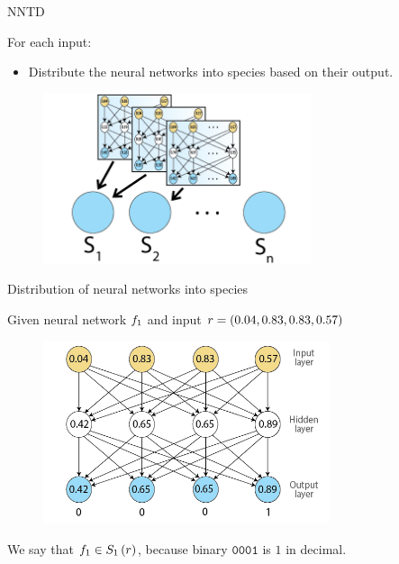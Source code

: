 \begin{frame}{NNTD}
\begin{center}
For each input:
  \begin{itemize}
	  \item Distribute the neural networks into species based on their output.
  \end{itemize}
     \begin{figure}[p]
  \includegraphics[width=0.7\textwidth]{images/speciesnn.png}
  \end{figure}
\end{center}
\end{frame}

\begin{frame}{Distribution of neural networks into species}
\begin{center}
Given neural network $f_1$ and input $r = (0.04, 0.83, 0.83, 0.57)$
  \begin{figure}[p]
  \includegraphics[width=0.75\textwidth]{images/nntdexample1.png}
  \end{figure}
We say that $f_1 \in S_{1}\left(r\right)$, because binary $\texttt{0001}$ is $1$ in decimal.
\end{center}
\end{frame}

